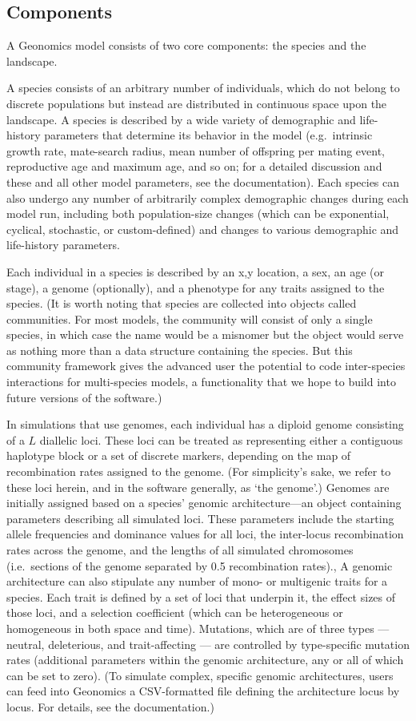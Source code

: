﻿\documentclass{article}
\begin{document}
\subsection{Components}
A Geonomics model consists of two core components: the species and the landscape.

A species consists of an arbitrary number of individuals, which do not belong to
discrete populations but instead are distributed in continuous space upon the landscape.
A species is described by a wide variety of demographic and life-history parameters
that determine its behavior in the model (e.g.\ intrinsic growth rate, mate-search radius,
mean number of offspring per mating event, reproductive age and maximum age, and so on;
for a detailed discussion and these and all other model parameters, see the documentation).
Each species can also undergo any number of arbitrarily complex demographic changes during
each model run, including both population-size changes
(which can be exponential, cyclical, stochastic, or custom-defined)
and changes to various demographic and life-history parameters.

Each individual in a species is described by an x,y location, a sex, an age (or stage),
a genome (optionally), and a phenotype for any traits assigned to the species.
(It is worth noting that species are collected into objects called communities.
For most models, the community will consist of only a single species, in which case the name would
be a misnomer but the object would serve as nothing more than a data structure containing the species.
But this community framework gives the advanced user the potential
to code inter-species interactions for multi-species models,
a functionality that we hope to build into future versions of the software.)

In simulations that use genomes, each individual has a diploid genome consisting of a $L$ diallelic loci.
These loci can be treated as representing either a contiguous haplotype block
or a set of discrete markers, depending on the map of recombination rates assigned to the genome.
(For simplicity's sake, we refer to these loci herein, and in the software generally, as `the genome'.)
Genomes are initially assigned based on a species' genomic architecture---an object containing
parameters describing all simulated loci.
These parameters include the starting allele frequencies and dominance values for all loci,
the inter-locus recombination rates across the genome, and the lengths of all simulated chromosomes
(i.e.\ sections of the genome separated by 0.5 recombination rates)., 
A genomic architecture can also stipulate any number of mono- or multigenic traits for a species.
Each trait is defined by a set of loci that underpin it, the effect sizes of those loci,
and a selection coefficient (which can be heterogeneous or homogeneous in both space and time).
Mutations, which are of three types --- neutral, deleterious, and trait-affecting --- are controlled by
type-specific mutation rates (additional parameters within the genomic architecture, any or all of which can be set to zero).
(To simulate complex, specific genomic architectures, users can feed into Geonomics a
CSV-formatted file defining the architecture locus by locus. For details, see the documentation.)
\end{document}
